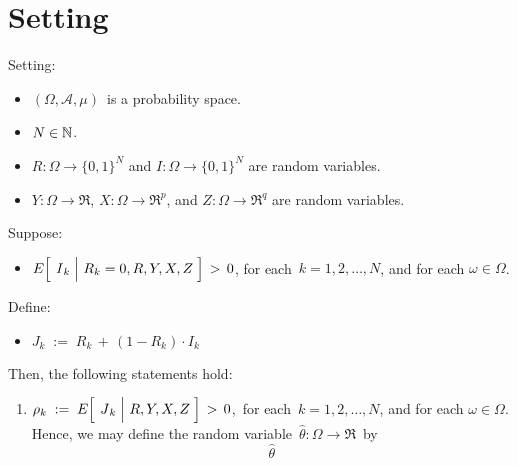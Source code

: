 

\section{Setting}
\setcounter{theorem}{0}
\setcounter{equation}{0}


\renewcommand{\theenumi}{\roman{enumi}}
\renewcommand{\labelenumi}{\textnormal{(\theenumi)}$\;\;$}



\begin{proposition}
\mbox{}
\vskip 0.1cm
\noindent
Setting:
\begin{itemize}
\item
	$(\Omega,\mathcal{A},\mu)$\, is a probability space.
\item
	$N \in \mathbb{N}$.
\item
	$R : \Omega \longrightarrow \{0,1\}^{N}$\; and
	$I : \Omega \longrightarrow \{0,1\}^{N}$
	are random variables.
\item
	$Y : \Omega \longrightarrow \Re$,\;
	$X : \Omega \longrightarrow \Re^{p}$,\; and\;
	$Z : \Omega \longrightarrow \Re^{q}$
	are random variables.
\end{itemize}
Suppose:
\begin{itemize}
\item
	$E\!\left[\;\left.\overset{{\color{white}.}}{I}_{k}\;\right\vert\,R_{k}=0,R,Y,X,Z\;\right] \, > \, 0$,\;
	for each \,$k = 1, 2, \ldots, N$, and for each $\omega \in \Omega$.
\end{itemize}
\vskip 0.3cm
\noindent
Define:
\begin{itemize}
\item
	$J_{k} \; := \; R_{k} \, + \, (1-R_{k}) \cdot I_{k}$
\end{itemize}
\vskip 0.3cm
\noindent
Then, the following statements hold:
\begin{enumerate}
\item
	$\rho_{k} \; := \; E\!\left[\;\left.\overset{{\color{white}.}}{J}_{k}\;\right\vert\,R,Y,X,Z\;\right] \, > \, 0$,\,
	for each \,$k = 1, 2, \ldots, N$, and for each $\omega \in \Omega$.
	\vskip 0.05cm
	\noindent
	Hence, we may define the random variable
	\,$\widehat{\theta} : \Omega \longrightarrow \Re$\,
	by
	\begin{equation*}
	\widehat{\theta}

\end{equation*}
\end{enumerate}
\end{proposition}
